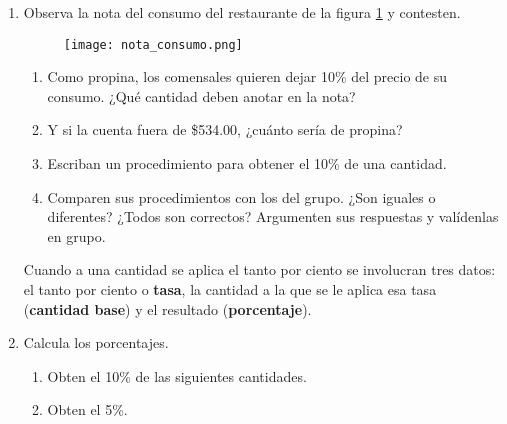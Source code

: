 \begin{enumerate}
    \item Observa la nota del consumo del restaurante de la figura \ref{fig:nota_consumo} y
          contesten.

          \begin{minipage}[t]{0.2\textwidth}
              \begin{figure}[H]
                  \centering
                  \texttt{[image: nota\_consumo.png]}
                  \label{fig:nota_consumo}
              \end{figure}
          \end{minipage}\hfill
          \begin{minipage}[t]{0.75\textwidth}
              \begin{enumerate}
                  \item Como propina, los comensales quieren dejar 10\% del precio de su consumo. ¿Qué cantidad deben anotar en la nota?\\
                  \item Y si la cuenta fuera de \$534.00, ¿cuánto sería de propina?\\
                  \item Escriban un procedimiento para obtener el 10\% de una cantidad.\\
                  \item Comparen sus procedimientos con los del grupo. ¿Son iguales o diferentes? ¿Todos son correctos? Argumenten sus respuestas y valídenlas en grupo.\\
              \end{enumerate}
          \end{minipage}

          \begin{boxH}
              Cuando a una cantidad se aplica el tanto por ciento se involucran tres
              datos: el tanto por ciento o \textbf{tasa}, la cantidad a la que se le aplica esa tasa
              (\textbf{cantidad base}) y el resultado (\textbf{porcentaje}).
          \end{boxH}
    \item Calcula los porcentajes.
          \begin{enumerate}
              \item Obten el 10\% de las siguientes cantidades.\\

              \item Obten el 5\%.\\


\end{enumerate}
\end{enumerate}
